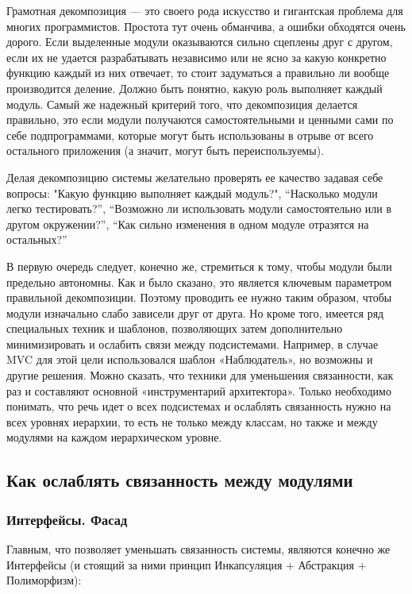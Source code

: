 \documentclass[a4paper]{article}
\begin{document}
Грамотная декомпозиция — это своего рода искусство и гигантская проблема для многих программистов. Простота тут очень обманчива, а ошибки обходятся очень дорого. Если выделенные модули оказываются сильно сцеплены друг с другом, если их не удается разрабатывать независимо или не ясно за какую конкретно функцию каждый из них отвечает, то стоит задуматься а правильно ли вообще производится деление. Должно быть понятно, какую роль выполняет каждый модуль. Самый же надежный критерий того, что декомпозиция делается правильно, это если модули получаются самостоятельными и ценными сами по себе подпрограммами, которые могут быть использованы в отрыве от всего остального приложения (а значит, могут быть переиспользуемы).

Делая декомпозицию системы желательно проверять ее качество задавая себе вопросы: "Какую функцию выполняет каждый модуль?", “Насколько модули легко тестировать?”, “Возможно ли использовать модули самостоятельно или в другом окружении?”, “Как сильно изменения в одном модуле отразятся на остальных?”

В первую очередь следует, конечно же, стремиться к тому, чтобы модули были предельно автономны. Как и было сказано, это является ключевым параметром правильной декомпозиции. Поэтому проводить ее нужно таким образом, чтобы модули изначально слабо зависели друг от друга. Но кроме того, имеется ряд специальных техник и шаблонов, позволяющих затем дополнительно минимизировать и ослабить связи между подсистемами. Например, в случае MVC для этой цели использовался шаблон «Наблюдатель», но возможны и другие решения. Можно сказать, что техники для уменьшения связанности, как раз и составляют основной «инструментарий архитектора». Только необходимо понимать, что речь идет о всех подсистемах и ослаблять связанность нужно на всех уровнях иерархии, то есть не только между классам, но также и между модулями на каждом иерархическом уровне.

\subsection{Как ослаблять связанность между модулями}

\subsubsection{Интерфейсы. Фасад}

Главным, что позволяет уменьшать связанность системы, являются конечно же Интерфейсы (и стоящий за ними принцип Инкапсуляция + Абстракция + Полиморфизм):
\end{document}
